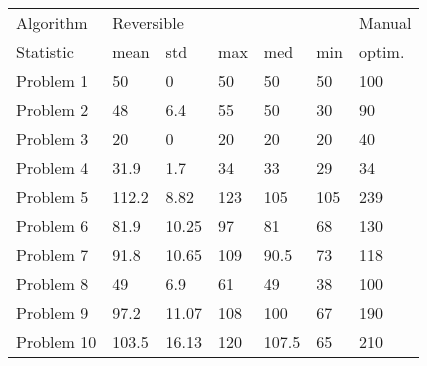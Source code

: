 \begin{tabular}{lllllll}
\toprule
Algorithm & \multicolumn{5}{l}{Reversible} & Manual \\
Statistic &       mean &    std &  max &    med &  min & optim. \\
\midrule
Problem 1  &         50 &      0 &   50 &     50 &   50 &    100 \\
Problem 2  &         48 &    6.4 &   55 &     50 &   30 &     90 \\
Problem 3  &         20 &      0 &   20 &     20 &   20 &     40 \\
Problem 4  &       31.9 &    1.7 &   34 &     33 &   29 &     34 \\
Problem 5  &      112.2 &   8.82 &  123 &    105 &  105 &    239 \\
Problem 6  &       81.9 &  10.25 &   97 &     81 &   68 &    130 \\
Problem 7  &       91.8 &  10.65 &  109 &   90.5 &   73 &    118 \\
Problem 8  &         49 &    6.9 &   61 &     49 &   38 &    100 \\
Problem 9  &       97.2 &  11.07 &  108 &    100 &   67 &    190 \\
Problem 10 &      103.5 &  16.13 &  120 &  107.5 &   65 &    210 \\
\bottomrule
\end{tabular}
